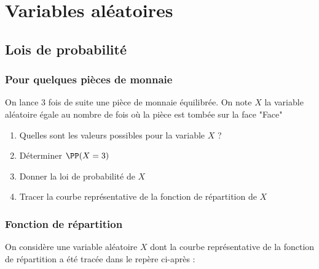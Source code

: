 \documentclass[oneside,12pt]{book}          %
\begin{document}
\chapter{Variables aléatoires}
\newpage

\section{Lois de probabilité}

\subsection{Pour quelques pièces de monnaie}
On lance $3$ fois de suite une pièce de monnaie équilibrée. On note $X$ la variable aléatoire égale au nombre de fois où la pièce est tombée sur la face "Face"
\begin{enumerate}
    \item Quelles sont les valeurs possibles pour la variable $X$ ?
    \item Déterminer $\PP(X=3)$
    \item Donner la loi de probabilité de $X$
    \item Tracer la courbe représentative de la fonction de répartition de $X$
\end{enumerate}



\subsection{Fonction de répartition}
On considère une variable aléatoire $X$ dont la courbe représentative de la fonction de répartition a été tracée dans le repère ci-après :
\end{document}
